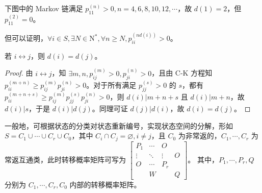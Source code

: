 \documentclass[../main.tex]{subfiles}
\begin{document}
\begin{example}
    下图中的 Markov 链满足 $p_{11}^{(n)}>0,n=4,6,8,10,12,\cdots$，故 $d(1)=2$，但 $p_{11}^{(2)}=0$。
    \begin{center}
    \end{center}
    \bigskip
\end{example}

但可以证明，$\forall i\in S,\exists N\in\mathrm N^*,\forall n\geq N,p_{ii}^{(nd(i))}>0$。

\begin{theorem}\label{thm:7.3.3}
    若 $i\leftrightarrow j$，则 $d(i)=d(j)$。
\end{theorem}

\begin{proof}
    由 $i\leftrightarrow j$，知 $\exists m,n,p_{ij}^{(m)}>0,p_{ji}^{(n)}>0$，且由 C-K 方程知 $p_{ii}^{(m+n)}\geq p_{ij}^{(m)}p_{ji}^{(n)}>0$。对于所有满足 $p_{jj}^{(s)}>0$ 的 $s$，都有 $p_{ii}^{(m+n+s)}\geq p_{ij}^{(m)}p_{jj}^{(s)}p_{ji}^{(n)}>0$，则 $d(i)|m+n+s$ 且 $d(i)|m+n$，故 $d(i)|s$，于是 $d(i)|d(j)$。同理可证 $d(j)|d(i)$，故 $d(i)=d(j)$。
\end{proof}

一般地，可根据状态的分类对状态重新编号，实现状态空间的分解，形如 $S=C_1\cup\cdots\cup C_r\cup C_0$，其中 $C_i\cap C_j=\varnothing,i\neq j$，且 $C_0$ 为非常返的，$C_1,\cdots,C_r$ 为常返互通类，此时转移概率矩阵可写为
$\left[\begin{matrix}
            P_1    & \cdots & O      &   \\
            \vdots & \ddots & \vdots & O \\
            O      & \cdots & P_r    &   \\
                   & W      &        & Q
        \end{matrix}\right]$。
其中，$P_1,\cdots,P_r,Q$ 分别为 $C_1,\cdots,C_r,C_0$ 内部的转移概率矩阵。
\end{document}
